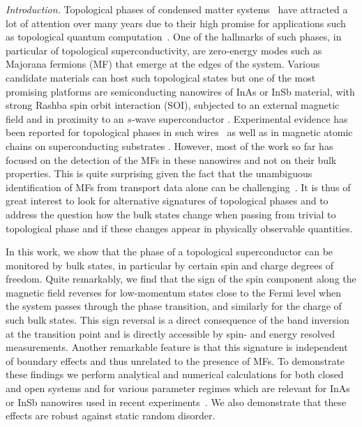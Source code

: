 \documentclass[prl,twocolumn,showpacs,floatfix,amsbsy,amsbsy,superscriptaddress]{revtex4-1}
\begin{document}
\emph{Introduction.} 
Topological phases of condensed matter systems~\cite{Hassan_Kane,Bernevig_book} have attracted a lot of attention over many years due to their high promise for applications such as topological quantum computation~\cite{Kitaev,Stern_RMP}. One of the hallmarks of such phases, in particular of topological superconductivity, are zero-energy modes such as Majorana fermions (MF) that emerge at the edges of the system. 
Various candidate materials can host such topological states \cite{Igor,Manisha2,Setiawan, Fu,MF_Sato,MF_Sarma,MF_Oreg,alicea_majoranas_2010,potter_majoranas_2011,
Klinovaja_CNT,Pascal,Fra,Rotating_field,Ali,RKKY_Basel,RKKY_Simon,Carlos} but one of the most promising platforms are semiconducting nanowires of InAs or InSb material, with strong Rashba spin orbit interaction (SOI), subjected to an external magnetic field and in proximity to an $s$-wave superconductor  \cite{Alicea,Beenakker}. Experimental evidence has been reported for topological phases in such 
wires~\cite{Mourik,Marcus,Heiblum,Rokhinson,Xu,Kuemmeth_Nature2016,Frolov,Deng_Marcus_Science2017} as well as  in magnetic atomic chains on superconducting substrates \cite{Franke,Yazdani,Meyer}. However, most of the work so far has focused on the detection 
of the MFs in these nanowires and not on their bulk properties. This is quite surprising given the fact that the unambiguous identification of MFs 
from transport data alone can be challenging~\cite{DeFranceschi2,DeFranceschi,Liu2012,Atland2012,Pikulin2012,Diego,Stanescu_2017,Chris,Manisha}.
It is thus of great interest to look for alternative signatures of topological phases and to address the question  how the bulk states change when passing from trivial to topological phase and if these changes appear in physically observable quantities.

In this work, we show that the phase of a topological superconductor can be monitored by  bulk states, in particular by certain spin and charge degrees of freedom.  Quite remarkably, we find that the sign of the spin component along the magnetic field reverses for low-momentum states close to the Fermi level when the system passes through the phase transition, and similarly for the charge of such bulk states. This sign reversal is a direct consequence of the band inversion at the transition point and is directly accessible by spin- and energy resolved measurements. Another remarkable feature is that this signature is independent of boundary effects and thus unrelated to the presence of MFs. To demonstrate these findings we perform analytical and numerical calculations for both closed and open systems and for various parameter regimes which are relevant for InAs or InSb nanowires used in recent experiments~\cite{Frolov,Mourik,Marcus,Heiblum,Rokhinson,Xu,Kuemmeth_Nature2016,Deng_Marcus_Science2017}. We also demonstrate that these effects are robust against static random disorder.
 
\end{document}
